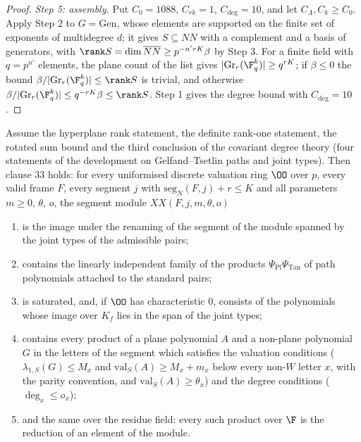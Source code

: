 \begin{proof}
\emph{Step 5: assembly.} Put $C_0=1088$, $C_{rk}=1$, $C_{\deg}=10$, and let $C_\Lambda,C_k\ge C_0$. Apply Step 2 to $G=\mathrm{Gen}$,
whose elements are supported on the finite set of exponents of multidegree $d$; it gives $S\subseteq NN$ with a complement
and a basis of generators, with $\rank S=\dim\overline{NN}\ge p^{-n'rK}\beta$ by Step 3. For a finite field with $q=p^{n'}$
elements, the plane count of the list gives $|\mathrm{Gr}_r(\F_q^k)|\ge q^{rK}$; if $\beta\le0$ the bound
$\beta/|\mathrm{Gr}_r(\F_q^k)|\le\rank S$ is trivial, and otherwise $\beta/|\mathrm{Gr}_r(\F_q^k)|\le q^{-rK}\beta\le\rank S$. Step 1
gives the degree bound with $C_{\deg}=10$.
\end{proof}

\begin{theorem}\label{pf:linkG:spacestatement}
Assume the hyperplane rank statement, the definite rank-one statement, the rotated sum bound and the third conclusion of
the covariant degree theory (four statements of the development on Gelfand--Tsetlin paths and joint types). Then clause
33 holds: for every uniformised discrete valuation ring $\OO$ over $p$, every valid frame $F$, every segment $j$ with
$\mathrm{seg}_N(F,j)+r\le K$ and all parameters $m\ge0$, $\theta$, $o$, the segment module $XX(F,j,m,\theta,o)$
\begin{enumerate}[label=(\roman*)]
\item is the image under the renaming of the segment of the module spanned by the joint types of the admissible pairs;
\item contains the linearly independent family of the products $\Psi_{\mathrm{Pl}}\Psi_{\mathrm{Tan}}$ of path polynomials
attached to the standard pairs;
\item is saturated, and, if $\OO$ has characteristic $0$, consists of the polynomials whose image over $K_f$ lies in the span of
the joint types;
\item contains every product of a plane polynomial $A$ and a non-plane polynomial $G$ in the letters of the segment which
satisfies the valuation conditions ($\lambda_{1,S}(G)\le M_x$ and $\mathrm{val}_S(A)\ge M_x+m_x$ below every non-$W$ letter
$x$, with the parity convention, and $\mathrm{val}_S(A)\ge\theta_x$) and the degree conditions ($\deg_x\le o_x$);
\item and the same over the residue field: every such product over $\F$ is the reduction of an element of the module.
\end{enumerate}
\end{theorem}

